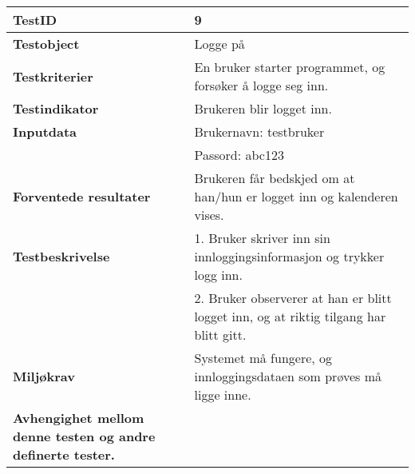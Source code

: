 	\begin{tabularx}{1.2\textwidth}{| p{5cm} | X |}
	\hline
	\textbf{TestID} 																& 9																	\\ \hline
	\textbf{Testobject} 															& Logge på															\\ \hline
	\textbf{Testkriterier} 															& En bruker starter programmet, og forsøker å logge seg inn.							\\ \hline
	\textbf{Testindikator} 															& Brukeren blir logget inn.													\\ \hline
	\textbf{Inputdata} 															& Brukernavn: testbruker													\\ 
																			& Passord: abc123														\\  \hline
	\textbf{Forventede resultater}									 				& Brukeren får bedskjed om at han/hun er logget inn og kalenderen vises.				\\ \hline
	\textbf{Testbeskrivelse} 														& 1. Bruker skriver inn sin innloggingsinformasjon og trykker logg inn.					\\
																			& 2. Bruker observerer at han er blitt logget inn, og at riktig tilgang har blitt gitt.					\\ \hline
	\textbf{Miljøkrav}			 												& Systemet må fungere, og innloggingsdataen som prøves må ligge inne.						\\ \hline
	\textbf{Avhengighet mellom denne testen og andre definerte tester.}		 				&				 													\\ \hline
	\end{tabularx}

\mbox{}\\

